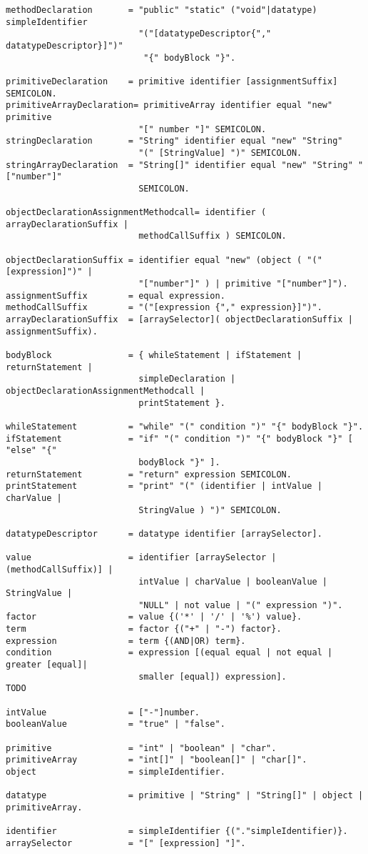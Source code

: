 \begin{verbatim}
methodDeclaration       = "public" "static" ("void"|datatype) simpleIdentifier
                          "("[datatypeDescriptor{"," datatypeDescriptor}]")" 
                           "{" bodyBlock "}".

primitiveDeclaration    = primitive identifier [assignmentSuffix] SEMICOLON.
primitiveArrayDeclaration= primitiveArray identifier equal "new" primitive 
                          "[" number "]" SEMICOLON.
stringDeclaration       = "String" identifier equal "new" "String" 
                          "(" [StringValue] ")" SEMICOLON.
stringArrayDeclaration	= "String[]" identifier equal "new" "String" "["number"]" 
                          SEMICOLON.

objectDeclarationAssignmentMethodcall= identifier ( arrayDeclarationSuffix | 
                          methodCallSuffix ) SEMICOLON.

objectDeclarationSuffix = identifier equal "new" (object ( "("[expression]")" |
                          "["number"]" ) | primitive "["number"]").
assignmentSuffix        = equal expression.
methodCallSuffix        = "("[expression {"," expression}]")".
arrayDeclarationSuffix  = [arraySelector]( objectDeclarationSuffix | assignmentSuffix).
 
bodyBlock               = { whileStatement | ifStatement | returnStatement | 
                          simpleDeclaration | objectDeclarationAssignmentMethodcall | 
                          printStatement }.

whileStatement          = "while" "(" condition ")" "{" bodyBlock "}".
ifStatement             = "if" "(" condition ")" "{" bodyBlock "}" [ "else" "{" 
                          bodyBlock "}" ].
returnStatement         = "return" expression SEMICOLON.
printStatement          = "print" "(" (identifier | intValue | charValue | 
                          StringValue ) ")" SEMICOLON.

datatypeDescriptor      = datatype identifier [arraySelector].

value                   = identifier [arraySelector | (methodCallSuffix)] | 
                          intValue | charValue | booleanValue | StringValue |
                          "NULL" | not value | "(" expression ")".
factor                  = value {('*' | '/' | '%') value}.
term                    = factor {("+" | "-") factor}.
expression              = term {(AND|OR) term}.
condition               = expression [(equal equal | not equal | greater [equal]|
                          smaller [equal]) expression].
TODO

intValue                = ["-"]number.
booleanValue            = "true" | "false".

primitive               = "int" | "boolean" | "char".
primitiveArray          = "int[]" | "boolean[]" | "char[]".
object                  = simpleIdentifier.

datatype                = primitive | "String" | "String[]" | object | primitiveArray.

identifier              = simpleIdentifier {("."simpleIdentifier)}.
arraySelector           = "[" [expression] "]".


\end{verbatim}


